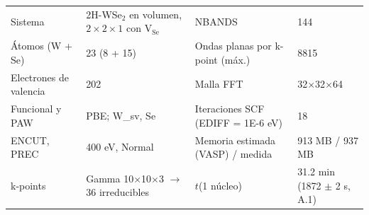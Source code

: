 \begin{tabular}{ll@{\hspace{1.5em}}ll}
\toprule
Sistema & 2H-WSe$_2$ en volumen, $2\times2\times1$ con V$_\mathrm{Se}$ & NBANDS & 144 \\
Átomos (W + Se) & 23 (8 + 15) & Ondas planas por k-point (máx.) & 8815 \\
Electrones de valencia & 202 & Malla FFT & 32$\times$32$\times$64 \\
Funcional y PAW & PBE; W\_sv, Se & Iteraciones SCF (EDIFF = 1E-6 eV) & 18 \\
ENCUT, PREC & 400 eV, Normal & Memoria estimada (VASP) / medida & 913 MB / 937 MB \\
k-points & Gamma 10$\times$10$\times$3 $\to$ 36 irreducibles & $t$(1 núcleo) & 31.2 min (1872 $\pm$ 2 s, A.1) \\
\bottomrule
\end{tabular}
